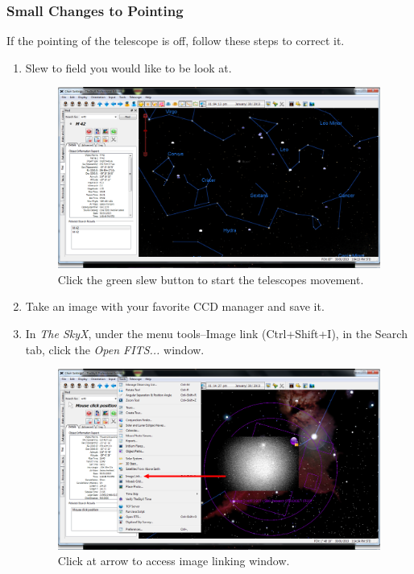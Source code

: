 \documentclass[12pt,twoside,a4paper]{report}
\begin{document}
\subsubsection{Small Changes to Pointing}
\label{small_changes_to_pointing}
If the pointing of the telescope is off, follow these steps to correct it.
\begin{enumerate}
 \item Slew to field you would like to be look at.
 \begin{figure}[h]
 \centering
    \includegraphics[width=\textwidth]{documentation_images/moving_telescope.png}
    \caption{\label{fig:moving_telescope} Click the green slew button to start the telescopes movement.}
\end{figure}
 \item \label{2} Take an image with your favorite CCD manager and save it.
 \item In \emph{The SkyX}, under the menu tools--Image link (Ctrl+Shift+I), in the Search tab, click the \emph{Open FITS...} window.
  \begin{figure}[h]
 \centering
    \includegraphics[width=\textwidth]{documentation_images/tools_menu_1_1.png}
    \caption{\label{fig:tools_menu} Click at arrow to access image linking window.}
    \end{figure}
    

\end{enumerate}
\end{document}

